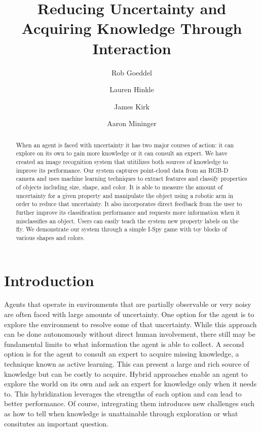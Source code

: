 \documentclass[11pt]{article}
\title{Reducing Uncertainty and Acquiring Knowledge Through Interaction}
\author{Rob Goeddel \and Lauren Hinkle \and James Kirk \and Aaron Mininger}
\date{}
\newcommand{\xxx}[1]{{\bf \color{red} #1}}
\begin{document}
\maketitle


\begin{abstract}
When an agent is faced with uncertainty it has two major courses of action: it can explore on its own to gain more knowledge or it can consult an expert. We have created an image recognition system that utitilizes both sources of knowledge to improve its performance. Our system captures point-cloud data from an RGB-D camera and uses machine learning techniques to extract features and classify properties of objects including size, shape, and color. It is able to measure the amount of uncertainty for a given property and manipulate the object using a robotic arm in order to reduce that uncertainty. It also incorporates direct feedback from the user to further improve its classification performance and requests more information when it misclassifies an object. Users can easily teach the system new property labels on the fly. We demonstrate our system through a simple I-Spy game with toy blocks of various shapes and colors.
\end{abstract}


\section{Introduction}
Agents that operate in environments that are partially observable or very noisy are often faced with large amounts of uncertainty. One option for the agent is to explore the environment to resolve some of that uncertainty. While this approach can be done autonomously without direct human involvement, there still may be fundamental limits to what information the agent is able to collect. A second option is for the agent to consult an expert to acquire missing knowledge, a technique known as active learning. This can present a large and rich source of knowledge but can be costly to acquire. Hybrid approaches enable an agent to explore the world on its own and ask an expert for knowledge only when it needs to. This hybridization leverages the strengths of each option and can lead to better performance. Of course, intregrating them introduces new challenges such as how to tell when knowledge is unattainable through exploration or what consitutes an important question.
\end{document}
